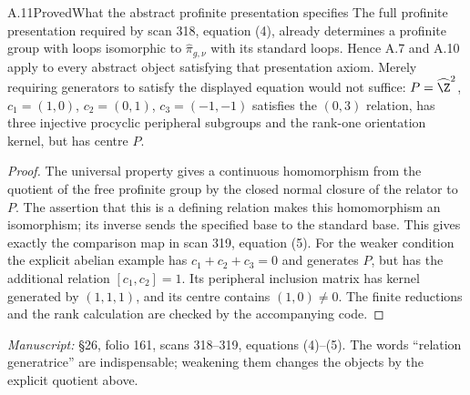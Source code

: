 \begin{claim}{A.11}{Proved}{What the abstract profinite presentation specifies}
The full profinite presentation required by scan 318, equation (4), already determines a profinite group with loops isomorphic to $\widehat\pi_{g,\nu}$ with its standard loops. Hence A.7 and A.10 apply to every abstract object satisfying that presentation axiom. Merely requiring generators to satisfy the displayed equation would not suffice: $P=\widehat\Z^2$, $c_1=(1,0)$, $c_2=(0,1)$, $c_3=(-1,-1)$ satisfies the $(0,3)$ relation, has three injective procyclic peripheral subgroups and the rank-one orientation kernel, but has centre $P$.
\end{claim}
\begin{proof}
The universal property gives a continuous homomorphism from the quotient of the free profinite group by the closed normal closure of the relator to $P$. The assertion that this is a defining relation makes this homomorphism an isomorphism; its inverse sends the specified base to the standard base. This gives exactly the comparison map in scan 319, equation (5). For the weaker condition the explicit abelian example has $c_1+c_2+c_3=0$ and generates $P$, but has the additional relation $[c_1,c_2]=1$. Its peripheral inclusion matrix has kernel generated by $(1,1,1)$, and its centre contains $(1,0)\ne0$. The finite reductions and the rank calculation are checked by the accompanying code.
\end{proof}
\noindent\emph{Manuscript:} \S26, folio 161, scans 318--319, equations (4)--(5). The words ``relation generatrice'' are indispensable; weakening them changes the objects by the explicit quotient above.

